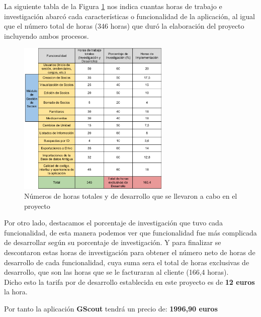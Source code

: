 


La siguiente tabla de la Figura \ref{fig:presupuesto} nos indica cuantas horas de trabajo e investigación abarcó cada características o funcionalidad de la aplicación, al igual que 
el número total de horas (346 horas) que duró la elaboración del proyecto incluyendo ambos procesos. \\

\begin{figure}[H]
\begin{center}
\includegraphics[width=0.65\textwidth]{images/presupuesto.jpg}
\caption{Números de horas totales y de desarrollo que se llevaron a cabo en el proyecto}
\label{fig:presupuesto}
\end{center}
\end{figure}

\newpage

Por otro lado, destacamos el porcentaje de investigación que tuvo cada funcionalidad, de esta manera podemos ver que funcionalidad fue más complicada de
desarrollar según su porcentaje de investigación. Y para finalizar se descontaron estas horas de investigación para obtener el número neto de horas de desarrollo de cada funcionalidad, cuya suma sera el 
total de horas exclusivas de desarrollo, que son las horas que se le facturaran al cliente (166,4 horas).\\


Dicho esto la tarifa por de desarrollo establecida en este proyecto es de \textbf{12 euros} la hora.\\

\bigskip

Por tanto la aplicación \textbf{GScout} tendrá un precio de: {\Huge \textbf{1996,90 euros}}\\


